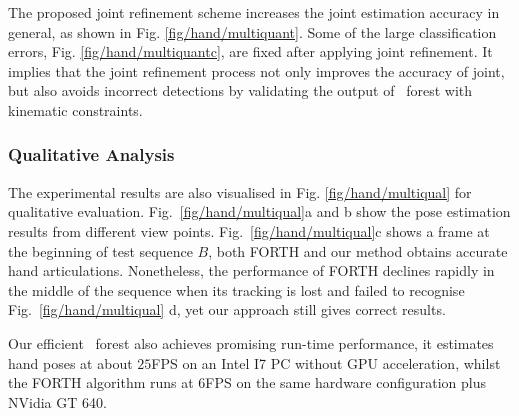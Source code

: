 The proposed joint refinement scheme increases the joint estimation accuracy in general, as shown in Fig. \ref{fig/hand/multiquant}. 
Some of the large classification errors, \eg Fig. \ref{fig/hand/multiquantc}, are fixed after applying joint refinement. It implies that the joint refinement process not only improves the accuracy of joint, but also avoids incorrect detections by validating the output of \STR\ forest with kinematic constraints.

\subsubsection{Qualitative Analysis} 
The experimental results are also visualised in Fig. \ref{fig/hand/multiqual} for qualitative evaluation. 
Fig.~\ref{fig/hand/multiqual}a and b show the pose estimation results from different view points.    
Fig.~\ref{fig/hand/multiqual}c shows a frame at the beginning of test sequence $B$, both FORTH and our method obtains accurate hand articulations. Nonetheless, the performance of FORTH declines rapidly in the middle of the sequence when its tracking is lost and failed to recognise Fig.~\ref{fig/hand/multiqual} d, yet our approach still gives correct results. 

Our efficient \STR\ forest also achieves promising run-time performance, it estimates hand poses at about $25$FPS on an Intel I7 PC without GPU acceleration, whilst the FORTH algorithm runs at $6$FPS on the same hardware configuration plus NVidia GT 640. 



